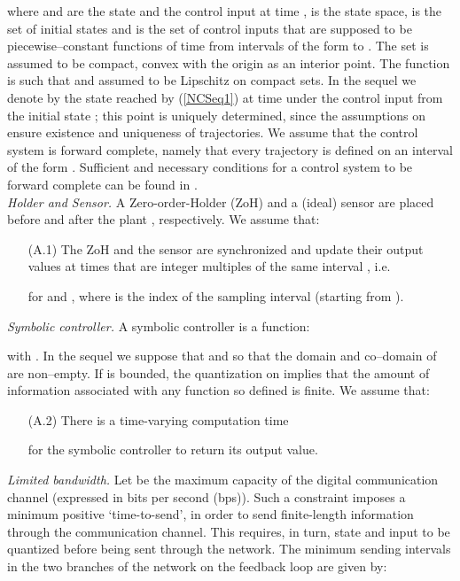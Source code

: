\documentclass{amsart}
\begin{document}
where  and  are the state and the control input at time ,  is the state space,  is the set of initial states and  is the set of control inputs that are supposed to be piecewise--constant functions of time from intervals of the form \mbox{} to . The set  is assumed to be compact, convex with the origin as an interior point. The function  is such that  and assumed to be Lipschitz on compact sets. 
In the sequel we denote by  the state reached by (\ref{NCSeq1}) at time  under the control input  from the initial state ; this point is uniquely determined, since the assumptions on  ensure existence and uniqueness of trajectories. We assume that the control system  is forward complete, namely that every trajectory is defined on an interval of the form . Sufficient and necessary conditions for a control system to be forward complete can be found in \cite{fc-theorem}.\\

\textit{Holder and Sensor.} A Zero-order-Holder (ZoH) and a (ideal) sensor are placed before and after the plant , respectively. We assume that: 

\begin{itemize}
\item[(A.1)] The ZoH and the sensor are synchronized and update their output values at times that are integer multiples of the same interval , i.e.

for  and , where  is the index of the sampling interval (starting from ).
\end{itemize}

\textit{Symbolic controller.} A symbolic controller is a function: 

with . In the sequel we suppose that  and  so that the domain and co--domain of  are non--empty. If  is bounded, the quantization on  implies that the amount of information associated with any function  so defined is finite. We assume that:
\begin{itemize}
\item[(A.2)] There is a time-varying computation time 

for the symbolic controller to return its output value.
\end{itemize}

\textit{Limited bandwidth.} Let  be the maximum capacity of the digital communication channel (expressed in bits per second (bps)). Such a constraint imposes a minimum positive `time-to-send', in order to send finite-length information through the communication channel. This requires, in turn, state and input to be quantized before being sent through the network. The minimum sending intervals in the two branches of the network on the feedback loop are given by:
\end{document}
